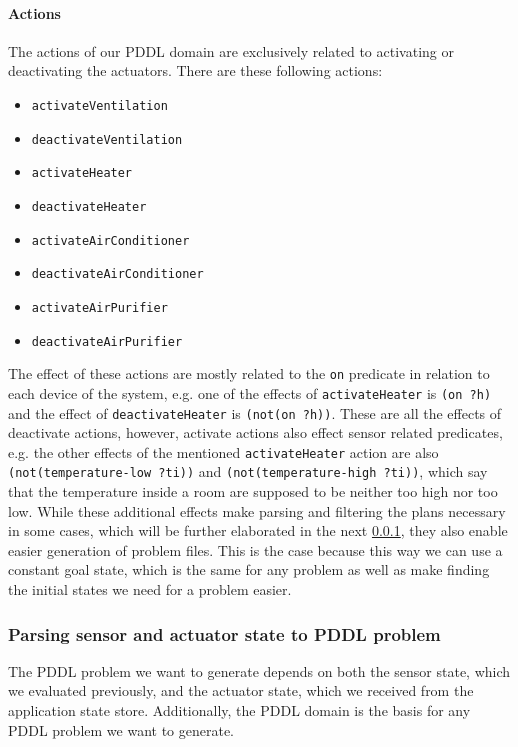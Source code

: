 \paragraph{Actions}
The actions of our PDDL domain are exclusively related to activating or deactivating the actuators.
There are these following actions:
\begin{itemize}
    \item \texttt{activateVentilation}
    \item \texttt{deactivateVentilation}
    \item \texttt{activateHeater}
    \item \texttt{deactivateHeater}
    \item \texttt{activateAirConditioner}
    \item \texttt{deactivateAirConditioner}
    \item \texttt{activateAirPurifier}
    \item \texttt{deactivateAirPurifier}
\end{itemize}
The effect of these actions are mostly related to the \texttt{on} predicate in relation to each device of the system, e.g. one of the effects of \texttt{activateHeater} is \texttt{(on ?h)} and the effect of \texttt{deactivateHeater} is \texttt{(not(on ?h))}.
These are all the effects of deactivate actions, however, activate actions also effect sensor related predicates, e.g. the other effects of the mentioned \texttt{activateHeater} action are also \texttt{(not(temperature-low ?ti))} and \texttt{(not(temperature-high ?ti))}, which say that the temperature inside a room are supposed to be neither too high nor too low.
While these additional effects make parsing and filtering the plans necessary in some cases, which will be further elaborated in the next \cref{subsubsec:parsing-sensor-and-actuator-state-to-pddl-problem}, they also enable easier generation of problem files.
This is the case because this way we can use a constant goal state, which is the same for any problem as well as make finding the initial states we need for a problem easier.

\subsubsection{Parsing sensor and actuator state to PDDL problem}\label{subsubsec:parsing-sensor-and-actuator-state-to-pddl-problem}
The PDDL problem we want to generate depends on both the sensor state, which we evaluated previously, and the actuator state, which we received from the application state store.
Additionally, the PDDL domain is the basis for any PDDL problem we want to generate.

